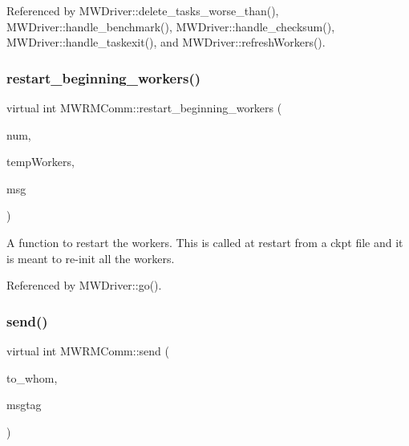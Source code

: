 Referenced by M\+W\+Driver\+::delete\+\_\+tasks\+\_\+worse\+\_\+than(), M\+W\+Driver\+::handle\+\_\+benchmark(), M\+W\+Driver\+::handle\+\_\+checksum(), M\+W\+Driver\+::handle\+\_\+taskexit(), and M\+W\+Driver\+::refresh\+Workers().

\mbox{\label{classMWRMComm_a831a7994d307d075f877b4415cb65657}} 
\subsubsection{\texorpdfstring{restart\+\_\+beginning\+\_\+workers()}{restart\_beginning\_workers()}}
{\footnotesize\ttfamily virtual int M\+W\+R\+M\+Comm\+::restart\+\_\+beginning\+\_\+workers (\begin{DoxyParamCaption}\item[{int $\ast$}]{num,  }\item[{M\+W\+Worker\+ID $\ast$$\ast$$\ast$}]{temp\+Workers,  }\item[{M\+Wmessages}]{msg }\end{DoxyParamCaption})\hspace{0.3cm}{\ttfamily [pure virtual]}}

A function to restart the workers. This is called at restart from a ckpt file and it is meant to re-\/init all the workers. 

Referenced by M\+W\+Driver\+::go().

\mbox{\label{classMWRMComm_abfe166a1b1c70e35069fbc0f1beb250f}} 
\subsubsection{\texorpdfstring{send()}{send()}}
{\footnotesize\ttfamily virtual int M\+W\+R\+M\+Comm\+::send (\begin{DoxyParamCaption}\item[{int}]{to\+\_\+whom,  }\item[{int}]{msgtag }\end{DoxyParamCaption})\hspace{0.3cm}{\ttfamily [pure virtual]}}

